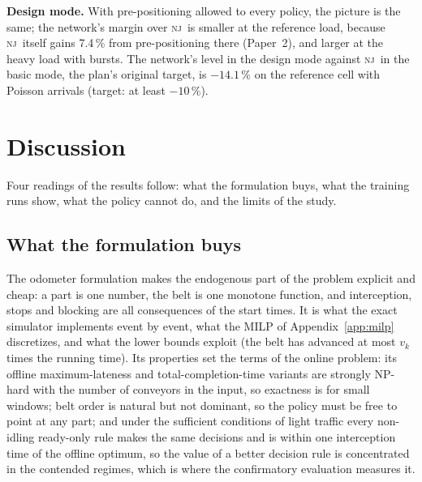 \documentclass[11pt,a4paper]{article}
\theoremstyle{plain}
\theoremstyle{definition}
\theoremstyle{remark}
\newcommand{\nj}{\textsc{nj}}
\begin{document}
\textbf{Design mode.} With pre-positioning allowed to every policy, the picture is the
same; the network's margin over \nj\ is smaller at the reference load, because \nj\ itself
gains 7.4\,\% from pre-positioning there (Paper~2), and larger at the heavy load with
bursts. The network's level in the design mode against \nj\ in the basic mode, the
plan's original target, is $-14.1$\,\% on the reference cell with Poisson arrivals
(target: at least $-10$\,\%).

\section{Discussion}\label{sec:discussion}

Four readings of the results follow: what the formulation buys, what the training runs show, what the policy cannot do, and the limits of the study.

\subsection{What the formulation buys}
The odometer formulation makes the endogenous part of the problem explicit and cheap: a
part is one number, the belt is one monotone function, and interception, stops and
blocking are all consequences of the start times. It is what the exact simulator
implements event by event, what the MILP of Appendix~\ref{app:milp} discretizes, and what
the lower bounds exploit (the belt has advanced at most $v_k$ times the running time).
Its properties set the terms of the online problem: its offline maximum-lateness and
total-completion-time variants are strongly NP-hard with the number of conveyors in the
input, so exactness is for small windows; belt order is natural but not dominant, so the policy must
be free to point at any part; and under the sufficient conditions of light traffic every
non-idling ready-only rule makes the same decisions and is within one interception time
of the offline optimum, so the value of
a better decision rule is concentrated in the contended regimes, which is where the
confirmatory evaluation measures it.
\end{document}
